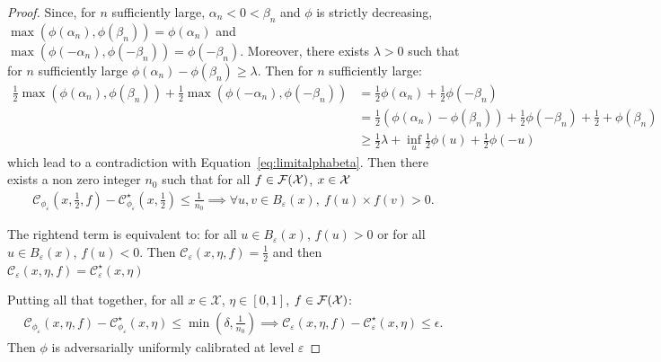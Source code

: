 \begin{proof}
    Since, for $n$ sufficiently large, $\alpha_n<0<\beta_n$ and $\phi$ is strictly decreasing, $\max\left(\phi(\alpha_n),\phi(\beta_n)\right) = \phi(\alpha_n)$ and $\max\left(\phi(-\alpha_n),\phi(-\beta_n)\right) = \phi(-\beta_n)$. Moreover, there exists $\lambda>0$ such that for $n$ sufficiently large $\phi(\alpha_n) - \phi(\beta_n)\geq \lambda$. Then for $n$ sufficiently large:
    \begin{align*}
        \frac12\max\left(\phi(\alpha_n),\phi(\beta_n)\right)+\frac12\max\left(\phi(-\alpha_n),\phi(-\beta_n)\right) &= \frac{1}{2} \phi(\alpha_n) +\frac12 \phi(-\beta_n)\\
        &= \frac{1}{2} \left(\phi(\alpha_n)- \phi(\beta_n)\right)+\frac12 \phi(-\beta_n)+\frac{1}{2}+ \phi(\beta_n)\\
        &\geq \frac12\lambda +\inf_u \frac12\phi(u)+\frac12\phi(-u)
    \end{align*}
    which lead to a contradiction with Equation~\ref{eq:limitalphabeta}. Then there exists a non zero integer $n_0$ such that for all $f\in\mathcal{F}(\mathcal{X})$, $x\in\mathcal{X}$
    \begin{align*}
        \mathcal{C}_{\phi_\varepsilon}(x,\frac12,f) - \mathcal{C}_{\phi_\varepsilon}^\star(x,\frac12)\leq \frac{1}{n_0} \implies \forall u,v\in B_\varepsilon(x),~ f(u)\times f(v)> 0.
    \end{align*}
    
    The rightend term is equivalent to: for all $u\in B_\varepsilon(x)$, $f(u)>0$ or for all $u\in B_\varepsilon(x)$, $f(u)<0$.  Then $\mathcal{C}_\varepsilon(x,\eta,f) =\frac12$ and then $\mathcal{C}_\varepsilon(x,\eta,f) = \mathcal{C}_\varepsilon^\star(x,\eta)$
    
    \medskip
    
    Putting all that together, for all $x\in\mathcal{X}$, $\eta\in [0,1]$, $f\in \mathcal{F}(\mathcal{X})$:
    \begin{align*}
        \mathcal{C}_{\phi_\varepsilon}(x,\eta,f) - \mathcal{C}_{\phi_\varepsilon}^\star(x,\eta)\leq \min(\delta,\frac{1}{n_0}) \implies \mathcal{C}_{\varepsilon}(x,\eta,f) - \mathcal{C}_{\varepsilon}^\star(x,\eta)\leq \epsilon.
    \end{align*}
    Then $\phi$ is adversarially uniformly calibrated at level $\varepsilon$
\end{proof}




